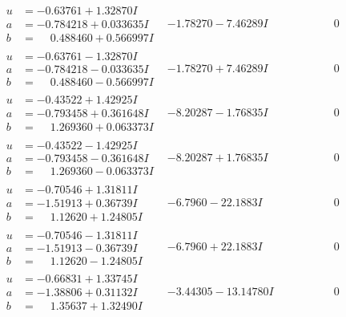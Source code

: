 \documentclass[1p]{elsarticle_modified}
\theoremstyle{definition}
\begin{document}
$$\begin{array}{c|c|c}
\begin{aligned}
u &= -0.63761 + 1.32870 I \\
a &= -0.784218 + 0.033635 I \\
b &= \phantom{-}0.488460 + 0.566997 I\end{aligned}
 & -1.78270 - 7.46289 I & \phantom{-0.000000 } 0 \\ \hline\begin{aligned}
u &= -0.63761 - 1.32870 I \\
a &= -0.784218 - 0.033635 I \\
b &= \phantom{-}0.488460 - 0.566997 I\end{aligned}
 & -1.78270 + 7.46289 I & \phantom{-0.000000 } 0 \\ \hline\begin{aligned}
u &= -0.43522 + 1.42925 I \\
a &= -0.793458 + 0.361648 I \\
b &= \phantom{-}1.269360 + 0.063373 I\end{aligned}
 & -8.20287 - 1.76835 I & \phantom{-0.000000 } 0 \\ \hline\begin{aligned}
u &= -0.43522 - 1.42925 I \\
a &= -0.793458 - 0.361648 I \\
b &= \phantom{-}1.269360 - 0.063373 I\end{aligned}
 & -8.20287 + 1.76835 I & \phantom{-0.000000 } 0 \\ \hline\begin{aligned}
u &= -0.70546 + 1.31811 I \\
a &= -1.51913 + 0.36739 I \\
b &= \phantom{-}1.12620 + 1.24805 I\end{aligned}
 & -6.7960 - 22.1883 I & \phantom{-0.000000 } 0 \\ \hline\begin{aligned}
u &= -0.70546 - 1.31811 I \\
a &= -1.51913 - 0.36739 I \\
b &= \phantom{-}1.12620 - 1.24805 I\end{aligned}
 & -6.7960 + 22.1883 I & \phantom{-0.000000 } 0 \\ \hline\begin{aligned}
u &= -0.66831 + 1.33745 I \\
a &= -1.38806 + 0.31132 I \\
b &= \phantom{-}1.35637 + 1.32490 I\end{aligned}
 & -3.44305 - 13.14780 I & \phantom{-0.000000 } 0\\

\end{array}$$
\end{document}
